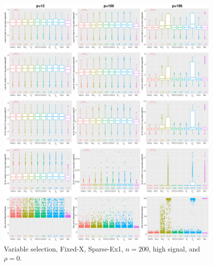 \begin{figure}[!ht]
\centering
\includegraphics[width=\textwidth]{figures/supplement/fixedx/subset_selection/Sparse-Ex1_n200_hsnr_rho0.eps}
\caption{Variable selection, Fixed-X, Sparse-Ex1, $n=200$, high signal, and $\rho=0$.}
\end{figure}
\clearpage
